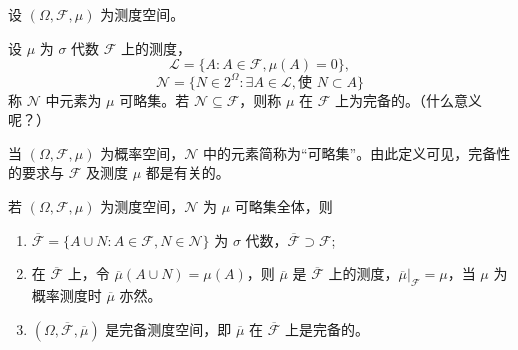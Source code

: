 \documentclass[lang=cn,10pt,thmcnt=section]{elegantbook}
\begin{document}
\begin{definition}
	设 \((\Omega, \mathscr{F}, \mu)\) 为测度空间。

设 \(\mu\) 为 \(\sigma\) 代数 \(\mathscr{F}\) 上的测度，
\[
\mathscr{L} = \{A : A \in \mathscr{F}, \mu(A) = 0\},
\]
\[
\mathscr{N} = \{N \in 2^\Omega : \exists A \in \mathscr{L}, \text{使 } N \subset A\}
\]
称 \(\mathscr{N}\) 中元素为 \(\mu\) 可略集。若 \(\mathscr{N} \subseteq \mathscr{F}\)，则称 \(\mu\) 在 \(\mathscr{F}\) 上为完备的。（什么意义呢？）

\end{definition}
当 \((\Omega, \mathscr{F}, \mu)\) 为概率空间，\(\mathscr{N}\) 中的元素简称为“可略集”。由此定义可见，完备性的要求与 \(\mathscr{F}\) 及测度 \(\mu\) 都是有关的。

\begin{theorem}[完备化扩张]
	若 \((\Omega, \mathscr{F}, \mu)\) 为测度空间，\(\mathscr{N}\) 为 \(\mu\) 可略集全体，则
\begin{enumerate}
    \item \(\overline{\mathscr{F}} = \{A \cup N : A \in \mathscr{F}, N \in \mathscr{N}\}\) 为 \(\sigma\) 代数，\(\overline{\mathscr{F}} \supset \mathscr{F}\);
    \item 在 \(\overline{\mathscr{F}}\) 上，令 \(\overline{\mu}(A \cup N) = \mu(A)\)，则 \(\overline{\mu}\) 是 \(\overline{\mathscr{F}}\) 上的测度，\(\overline{\mu}|_{\mathscr{F}} = \mu\)，当 \(\mu\) 为概率测度时 \(\overline{\mu}\) 亦然。
    \item \((\Omega, \overline{\mathscr{F}}, \overline{\mu})\) 是完备测度空间，即 \(\overline{\mu}\) 在 \(\overline{\mathscr{F}}\) 上是完备的。
\end{enumerate}
\end{theorem}
\end{document}
